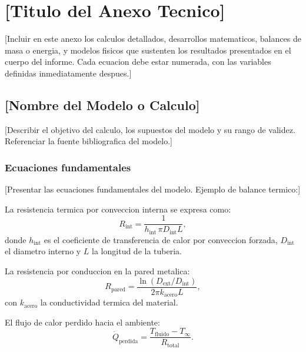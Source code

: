 \appendix
\section{[Titulo del Anexo Tecnico]}
\label{appendix:calculations}

[Incluir en este anexo los calculos detallados, desarrollos matematicos,
balances de masa o energia, y modelos fisicos que sustenten los resultados
presentados en el cuerpo del informe. Cada ecuacion debe estar numerada,
con las variables definidas inmediatamente despues.]

\subsection{[Nombre del Modelo o Calculo]}

[Describir el objetivo del calculo, los supuestos del modelo y su rango
de validez. Referenciar la fuente bibliografica del modelo.]

\subsubsection{Ecuaciones fundamentales}

[Presentar las ecuaciones fundamentales del modelo. Ejemplo de balance termico:]

La resistencia termica por conveccion interna se expresa como:
\begin{equation}
    R_{\mathrm{int}} = \frac{1}{h_{\mathrm{int}} \, \pi D_{\mathrm{int}} L},
    \label{eq:r_int}
\end{equation}
donde $h_{\mathrm{int}}$ es el coeficiente de transferencia de calor por conveccion
forzada, $D_{\mathrm{int}}$ el diametro interno y $L$ la longitud de la tuberia.

La resistencia por conduccion en la pared metalica:
\begin{equation}
    R_{\mathrm{pared}} = \frac{\ln(D_{\mathrm{ext}}/D_{\mathrm{int}})}{2\pi k_{\mathrm{acero}} L},
    \label{eq:r_pared}
\end{equation}
con $k_{\mathrm{acero}}$ la conductividad termica del material.

El flujo de calor perdido hacia el ambiente:
\begin{equation}
    \dot{Q}_{\mathrm{perdida}} = \frac{T_{\mathrm{fluido}} - T_{\infty}}{R_{\mathrm{total}}}.
    \label{eq:q_perdida}
\end{equation}

